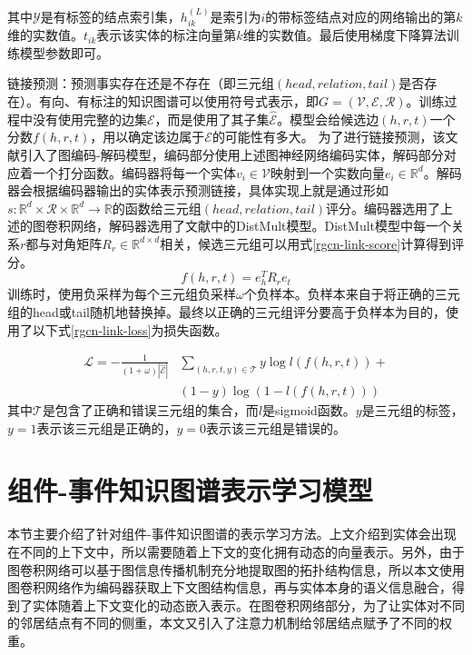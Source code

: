 其中$\mathcal{Y}$是有标签的结点索引集，$h_{i k}^{(L)}$是索引为$i$的带标签结点对应的网络输出的第$k$维的实数值。$t_{i k}$表示该实体的标注向量第$k$维的实数值。最后使用梯度下降算法训练模型参数即可。

链接预测：预测事实存在还是不存在（即三元组$(head,relation,tail)$是否存在）。有向、有标注的知识图谱可以使用符号式表示，即$G=(\mathcal{V}, \mathcal{E}, \mathcal{R})$。训练过程中没有使用完整的边集$\mathcal{E}$，而是使用了其子集$\hat{\mathcal{E}}$。模型会给候选边$(h, r, t)$一个分数$f(h, r, t)$，用以确定该边属于$\mathcal{E}$的可能性有多大。
为了进行链接预测，该文献引入了图编码-解码模型，编码部分使用上述图神经网络编码实体，解码部分对应着一个打分函数。编码器将每一个实体$v_{i} \in \mathcal{V}$映射到一个实数向量$e_{i} \in \mathbb{R}^{d}$。解码器会根据编码器输出的实体表示预测链接，具体实现上就是通过形如$s: \mathbb{R}^{d} \times \mathcal{R} \times \mathbb{R}^{d} \rightarrow \mathbb{R}$的函数给三元组$(head, relation, tail)$评分。编码器选用了上述的图卷积网络，解码器选用了文献\parencite{yang2014embedding}中的DistMult模型。DistMult模型中每一个关系$r$都与对角矩阵$R_{r} \in \mathbb{R}^{d \times d}$相关，候选三元组可以用式\ref{rgcn-link-score}计算得到评分。
\begin{equation}
    f(h, r, t)=e_{h}^{T} R_{r} e_{t}
    \label{rgcn-link-score}
\end{equation}
训练时，使用负采样为每个三元组负采样$\omega$个负样本。负样本来自于将正确的三元组的head或tail随机地替换掉。最终以正确的三元组评分要高于负样本为目的，使用了以下式\ref{rgcn-link-loss}为损失函数。

\begin{equation}
    \begin{aligned}
        \mathcal{L}=-\frac{1}{(1+\omega)|\hat{\mathcal{E}}|} & \sum_{(h, r, t, y) \in \mathcal{T}} y \log l(f(h, r, t))+\\
        &(1-y) \log (1-l(f(h, r, t)))
        \end{aligned}
    \label{rgcn-link-loss}
\end{equation}
其中$\mathcal{T}$是包含了正确和错误三元组的集合，而$l$是sigmoid函数。$y$是三元组的标签，$y=1$表示该三元组是正确的，$y=0$表示该三元组是错误的。

\section{组件-事件知识图谱表示学习模型}
本节主要介绍了针对组件-事件知识图谱的表示学习方法。上文介绍到实体会出现在不同的上下文中，所以需要随着上下文的变化拥有动态的向量表示。另外，由于图卷积网络可以基于图信息传播机制充分地提取图的拓扑结构信息，所以本文使用图卷积网络作为编码器获取上下文图结构信息，再与实体本身的语义信息融合，得到了实体随着上下文变化的动态嵌入表示。在图卷积网络部分，为了让实体对不同的邻居结点有不同的侧重，本文又引入了注意力机制给邻居结点赋予了不同的权重。
